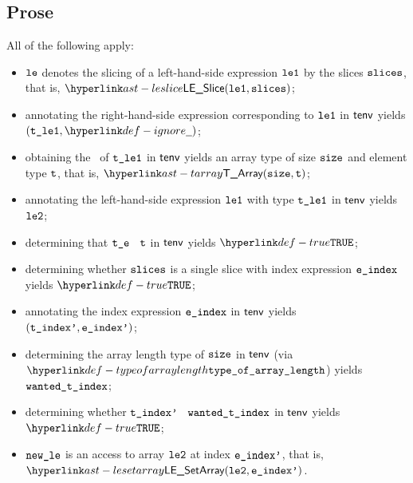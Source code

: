 \subsection{Prose}
All of the following apply:
\begin{itemize}
  \item $\texttt{le}$ denotes the slicing of a left-hand-side expression $\texttt{le1}$ by the slices $\texttt{slices}$, that is, $\LESlice(\vleone, \slices)$;
  \item annotating the right-hand-side expression corresponding to $\texttt{le1}$ in $\textsf{tenv}$ yields \\ $(\vtleone, \Ignore)$\ProseOrTypeError;
  \item obtaining the \structure\ of $\texttt{t\_le1}$ in $\textsf{tenv}$ yields an array type of size $\texttt{size}$ and element type $\texttt{t}$, that is, $\TArray(\size, \vt)$\ProseOrTypeError;
  \item annotating the left-hand-side expression $\texttt{le1}$ with type $\texttt{t\_le1}$ in $\textsf{tenv}$ yields $\texttt{le2}$\ProseOrTypeError;
  \item determining that $\texttt{t\_e}$ \typesatisfies\ $\texttt{t}$ in $\textsf{tenv}$ yields $\True$\ProseOrTypeError;
  \item determining whether $\texttt{slices}$ is a single slice with index expression $\texttt{e\_index}$ yields $\True$\ProseOrTypeError;
  \item annotating the index expression $\texttt{e\_index}$ in $\textsf{tenv}$ yields $(\texttt{t\_index'}, \texttt{e\_index'})$\ProseOrTypeError;
  \item determining the array length type of $\texttt{size}$ in $\textsf{tenv}$ (via $\typeofarraylength$) yields $\texttt{wanted\_t\_index}$;
  \item determining whether $\texttt{t\_index'}$ \typesatisfies\ $\texttt{wanted\_t\_index}$ in $\textsf{tenv}$ yields \\
        $\True$\ProseOrTypeError;
  \item $\texttt{new\_le}$ is an access to array $\texttt{le2}$ at index $\texttt{e\_index'}$, that is, \\ $\LESetArray(\vletwo, \eindexp)$.
\end{itemize}



